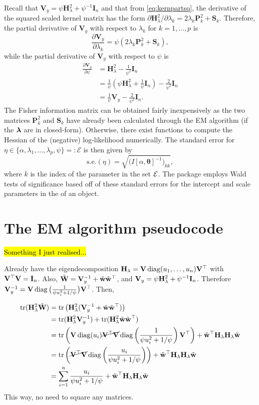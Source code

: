 Recall that $\mathbf V_y = \psi\mathbf H_\lambda^2 + \psi^{-1}\mathbf I_n$ and that from \eqref{eq:kernpartsq}, the derivative of the squared scaled kernel matrix has the form $\partial\mathbf H_\lambda^2 / \partial\lambda_k = 2\lambda_k\mathbf P_k^2 + \mathbf S_k$. Therefore, the partial derivative of $\mathbf V_y$ with respect to $\lambda_k$ for $k = 1,\dots,p$ is
\[
	\frac{\partial\mathbf V_y}{\partial\lambda_k} = \psi\left(2\lambda_k\mathbf P_k^2 + \mathbf S_k \right),
\]
while the partial derivative of $\mathbf V_y$ with respect to $\psi$ is
\begin{align*}
	\frac{\partial\mathbf V_y}{\partial\psi} &= \mathbf H_\lambda^2 - \frac{1}{\psi^2}\mathbf I_n \\
	&= \frac{1}{\psi}\left(\psi\mathbf H_\lambda^2 + \frac{1}{\psi}\mathbf I_n \right) - \frac{2}{\psi^2}\mathbf I_n \\
	&= \frac{1}{\psi}\mathbf V_y - \frac{2}{\psi^2}\mathbf I_n.
\end{align*}
The Fisher information matrix can be obtained fairly inexpensively as the two matrices $\mathbf P_k^2$ and $\mathbf S_k$ have already been calculated through the EM algorithm (if the $\boldsymbol\lambda$ are in closed-form). Otherwise, there exist  functions to compute the Hessian of the (negative) log-likelihood numerically. The standard error for $\eta \in \{ \alpha, \lambda_1, \dots, \lambda_p, \psi \} =: \mathcal E$ is then given by
\[
	\text{s.e.}(\eta) = \sqrt{\big(I[\alpha,\boldsymbol{\theta}]^{-1}\big)_{kk}},
\]
where $k$ is the index of the parameter in the set ${\mathcal E}$. The  package employs Wald tests of significance based off of these standard errors for the intercept and scale parameters in the  of an  object.

\section{The EM algorithm pseudocode}
\label{apx:a}

\hl{Something I just realised...}

Already have the eigendecomposition $\mathbf H_\lambda = {\mathbf V} \operatorname{diag}(u_1, \dots, u_n) {\mathbf V}^\top$ with ${\mathbf V}^\top{\mathbf V} = {\mathbf I}_n$. 
Also, $\tilde{\mathbf W} = {\mathbf V}_y^{-1} + \tilde{\mathbf w}\tilde{\mathbf w}^\top$, and ${\mathbf V}_y = \psi\mathbf H_\lambda^2 + \psi^{-1}{\mathbf I}_n$.
Therefore${\mathbf V}_y^{-1} = {\mathbf V} \operatorname{diag}\big(\frac{1}{\psi u_i^2 + 1/\psi}\big) {\mathbf V}^\top$.
Then,

\begin{align*}
  \operatorname{tr}(\mathbf H_\lambda^2\tilde{\mathbf W}) 
  &= \operatorname{tr}\big(\mathbf H_\lambda^2({\mathbf V}_y^{-1} + \tilde{\mathbf w}\tilde{\mathbf w}^\top)\big) \\
  &= \operatorname{tr}(\mathbf H_\lambda^2{\mathbf V}_y^{-1}) + \operatorname{tr}(\mathbf H_\lambda^2\tilde{\mathbf w}\tilde{\mathbf w}^\top) \\
  &= \operatorname{tr}\left(
  {\mathbf V} \operatorname{diag}(u_i) 
  \cancel{{\mathbf V}^\top {\mathbf V}}
  \operatorname{diag}\left(\frac{1}{\psi u_i^2 + 1/\psi}\right) {\mathbf V}^\top \right) + 
  \tilde{\mathbf w}^\top\mathbf H_\lambda\mathbf H_\lambda\tilde{\mathbf w} \\
  &= \operatorname{tr}\left(
  \cancel{{\mathbf V}^\top{\mathbf V}}
  \operatorname{diag}\left(\frac{u_i}{\psi u_i^2 + 1/\psi}\right)  
  \right) + 
  \tilde{\mathbf w}^\top\mathbf H_\lambda\mathbf H_\lambda\tilde{\mathbf w} \\
  &= \sum_{i=1}^n \frac{u_i}{\psi u_i^2 + 1/\psi} + \tilde{\mathbf w}^\top\mathbf H_\lambda\mathbf H_\lambda\tilde{\mathbf w}
\end{align*}
This way, no need to square any matrices.

